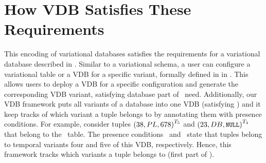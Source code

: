 \section{How VDB Satisfies These Requirements}
\label{sec:vdb-sat-req}




This encoding of variational databases satisfies the requirements for a
variational database described in . Similar to a variational schema, a user
can configure a variational table or a VDB for a specific variant, formally defined in
 in . This allows users to deploy a VDB for a
specific configuration and generate the corresponding VDB variant, satisfying
database part of \nThree\ need.
%
Additionally, 
our VDB framework puts all variants of a database into
one VDB (satisfying \nZero) 
and it keep tracks of which variant a tuple belongs to by 
annotating them with presence conditions. 
For example, consider tuples
\ensuremath{\annot [\tFive] {(38, PL, 678)}}
and 
\ensuremath{\annot [\tFour] {(23, DB, \nul)}}
that belong to the \ecourse\ table. 
The presence conditions \tFive\ and \tFour\ state that tuples belong to temporal
variants four and five of this VDB, respectively.
Hence, this framework tracks which variants a tuple belongs to 
(first part of \nTwo).


